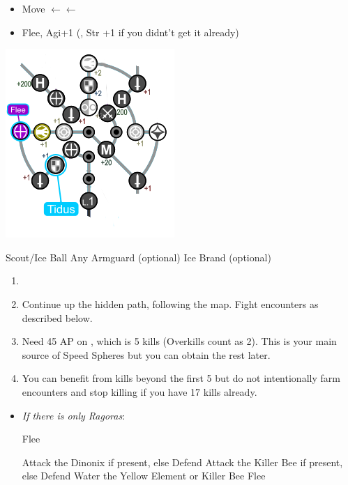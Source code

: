 \begin{spheregrid}
    \begin{itemize}
        \tidusf
        \begin{itemize}
            \item Move $\leftarrow\leftarrow$
            \item Flee, Agi+1 (, Str +1 if you didnt't get it already)
        \end{itemize}
    \end{itemize}
    \includegraphics{graphics/Tidus_Kilika}
\end{spheregrid}
\begin{equip}
    \begin{itemize}
        \wakkaf Scout/Ice Ball
        \wakkaf Any Armguard (optional)
        \tidusf Ice Brand (optional)
    \end{itemize}
\end{equip}
\begin{enumerate}[resume]
    \item \formation{\tidus}{\wakka}{\lulu}
    \item Continue up the hidden path, following the map. Fight encounters as described below.
    \item Need 45 AP on \tidus, which is 5 kills (Overkills count as 2). This is your main source of Speed Spheres but you can obtain the rest later.
    \item You can benefit from kills beyond the first 5 but do not intentionally farm encounters and stop killing if you have 17 kills already.
\end{enumerate}
\begin{encounters}
    \begin{itemize}
        \item \textit{If there is only Ragoras}:
            \begin{itemize}
                \tidusf Flee
            \end{itemize}
        \tidusf Attack the Dinonix if present, else Defend
        \wakkaf Attack the Killer Bee if present, else Defend
        \luluf Water the Yellow Element or Killer Bee
        \tidusf Flee
    \end{itemize}
\end{encounters}
